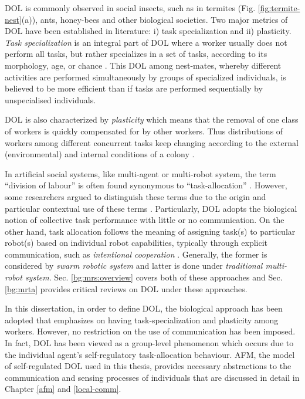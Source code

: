 DOL is commonly observed in social insects, such as in termites (Fig. \ref{fig:termite-nest}(a)), ants, honey-bees and other biological societies. Two major metrics of DOL have been established in literature: i) task specialization and ii) plasticity. {\em Task specialization} is an integral part of DOL where a worker usually does not perform all tasks, but rather specializes in a set of tasks, according to its morphology, age, or chance \cite{Bonabeau+1999}. This DOL among nest-mates, whereby different activities are performed simultaneously by groups of specialized individuals, is believed to be more efficient than if tasks are performed sequentially by unspecialised individuals.

DOL is also characterized by {\em plasticity} which means that the removal of one class of workers is quickly compensated for by other workers. Thus distributions of workers among different concurrent tasks keep changing according to the external (environmental) and internal conditions of a colony \cite{Garnier+2007}.

In artificial social systems, like multi-agent or multi-robot system, the term ``division of labour'' is often found synonymous to ``task-allocation'' \cite{Shen+2001}. However, some researchers  argued to distinguish these terms due to the origin and particular contextual use of these terms \cite{Labella2007}. Particularly, DOL adopts the biological notion of collective task performance with little or no communication. On the other hand, task allocation follows the meaning of assigning task(s) to particular robot(s) based on individual robot capabilities, typically through explicit communication, such as {\em intentional cooperation} \cite{Parker1998}. Generally, the former is considered by \textit{swarm robotic system} and latter is done under {\em traditional multi-robot system}. Sec. \ref{bg:mrs:overview} covers both of these approaches and Sec. \ref{bg:mrta} provides critical reviews on DOL under these approaches.

In this dissertation, in order to define DOL, the biological approach has been adopted that emphasizes on having task-specialization and plasticity among workers. However, no restriction on the use of communication has been imposed. In fact, DOL has been viewed as a group-level phenomenon which occurs due to the individual agent's self-regulatory task-allocation behaviour. AFM, the model of self-regulated DOL used in this thesis, provides necessary abstractions to the communication and sensing processes of individuals that are discussed in detail in Chapter \ref{afm} and \ref{local-comm}. 
